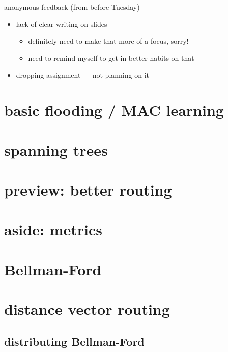 \begin{frame}{anonymous feedback (from before Tuesday)}
    \begin{itemize}
    \item lack of clear writing on slides
        \begin{itemize}
        \item definitely need to make that more of a focus, sorry!
        \item need to remind myself to get in better habits on that
        \end{itemize}
    \item dropping assignment --- not planning on it
    \end{itemize}
\end{frame}

\section{basic flooding / MAC learning}


\section{spanning trees}


\section{preview: better routing}


\section{aside: metrics}


\section{Bellman-Ford}


\section{distance vector routing}
\subsection{distributing Bellman-Ford}


